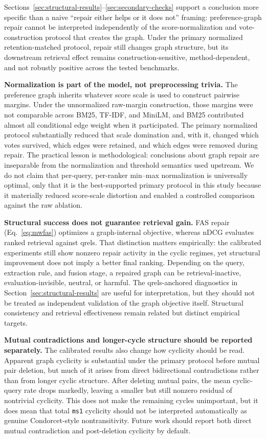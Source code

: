 \documentclass[manuscript,anonymous,review]{acmart}
\begin{document}
Sections~\ref{sec:structural-results}--\ref{sec:secondary-checks} support a
conclusion more specific than a naive ``repair either helps or it does not''
framing: preference-graph repair cannot be interpreted independently of the
score-normalization and vote-construction protocol that creates the graph.
Under the primary normalized retention-matched protocol, repair still changes
graph structure, but its downstream retrieval effect remains
construction-sensitive, method-dependent, and not robustly positive across the
tested benchmarks.

\textbf{Normalization is part of the model, not preprocessing trivia.} The
preference graph inherits whatever score scale is used to construct pairwise
margins. Under the unnormalized raw-margin construction, those margins were not
comparable across BM25, TF-IDF, and MiniLM, and BM25 contributed almost all
conditional edge weight when it participated. The primary normalized protocol
substantially reduced that scale domination and, with it, changed which votes
survived, which edges were retained, and which edges were removed during
repair. The practical lesson is methodological: conclusions about graph repair
are inseparable from the normalization and threshold semantics used upstream.
We do not claim that per-query, per-ranker min--max normalization is universally
optimal, only that it is the best-supported primary protocol in this study
because it materially reduced score-scale distortion and enabled a controlled
comparison against the raw ablation.

\textbf{Structural success does not guarantee retrieval gain.} FAS repair
(Eq.~\eqref{eq:mwfas}) optimizes a graph-internal objective, whereas nDCG
evaluates ranked retrieval against qrels. That distinction matters empirically:
the calibrated experiments still show nonzero repair activity in the cyclic
regimes, yet structural improvement does not imply a better final ranking.
Depending on the query, extraction rule, and fusion stage, a repaired graph can
be retrieval-inactive, evaluation-invisible, neutral, or harmful. The
qrels-anchored diagnostics in Section~\ref{sec:structural-results} are useful
for interpretation, but they should not be treated as independent validation of
the graph objective itself. Structural consistency and retrieval effectiveness
remain related but distinct empirical targets.

\textbf{Mutual contradictions and longer-cycle structure should be reported
separately.} The calibrated results also change how cyclicity should be read.
Apparent graph cyclicity is substantial under the primary protocol before mutual
pair deletion, but much of it arises from direct bidirectional contradictions
rather than from longer cyclic structure. After deleting mutual pairs, the mean
cyclic-query rate drops markedly, leaving a smaller but still nonzero residual
of nontrivial cyclicity. This does not make the remaining cycles unimportant,
but it does mean that total \texttt{ms1} cyclicity should not be interpreted
automatically as genuine Condorcet-style nontransitivity. Future work should
report both direct mutual contradiction and post-deletion cyclicity by default.
\end{document}

